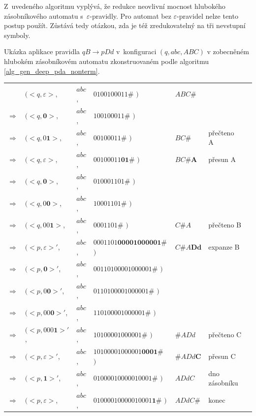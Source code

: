 Z~uvedeného algoritmu vyplývá, že redukce neovlivní mocnost hlubokého zásobníkového automatu s~$\varepsilon$-pravidly. Pro automat bez $\varepsilon$-pravidel nelze tento postup použít. Zůstává tedy otázkou, zda je též zredukovatelný na tři nevstupní symboly.


\begin{Example}
Ukázka aplikace pravidla $qB \rightarrow p Dd$ v~konfiguraci $(q, abc, ABC)$ v zobecněném hlubokém zásobníkovém automatu zkonstruovaném podle algoritmu \ref{alg_gen_deep_pda_nonterm}.

\begin{center}
\begin{tabular}{llll|l|ll}
                & $( <q, \varepsilon>$,  & $abc$, & $0100100011\#$         $)$ & $ABC\#$ \\
$\Rightarrow$   & $( <q, \mathbf{0}>$,            & $abc$, & $100100011\#$         $)$ & \\
$\Rightarrow$   & $( <q, 0\mathbf{1}>$,           & $abc$, & $00100011\#$         $)$ &   $BC\#$ & přečteno A~\\
$\Rightarrow$   & $( <q, \varepsilon>$,  & $abc$, & $00100011\mathbf{01}\#$         $)$ & $BC\#\mathbf{A}$ & přesun A~\\
$\Rightarrow$   & $( <q, \mathbf{0}>$,            & $abc$, & $010001101\#$         $)$ & \\
$\Rightarrow$   & $( <q, 0\mathbf{0}>$,           & $abc$, & $10001101\#$         $)$ & \\
$\Rightarrow$   & $( <q, 00\mathbf{1}>$,          & $abc$, & $0001101\#$         $)$ &    $C\#A$ & přečteno B \\
$\Rightarrow$   & $( <p,\varepsilon>'$,   & $abc$, & $0001101\mathbf{00001000001}\#$         $)$ & $C\#A\mathbf{Dd}$ & expanze B \\
$\Rightarrow$   & $( <p,\mathbf{0}>'$,   & $abc$, & $00110100001000001\#$         $)$ & \\
$\Rightarrow$   & $( <p,0\mathbf{0}>'$,   & $abc$, & $0110100001000001\#$         $)$ & \\
$\Rightarrow$   & $( <p,00\mathbf{0}>'$,   & $abc$, & $110100001000001\#$         $)$ & \\
$\Rightarrow$   & $( <p,000\mathbf{1}>'$,   & $abc$, & $10100001000001\#$         $)$ & $\#ADd$ & přečteno C  \\
$\Rightarrow$   & $( <p,\varepsilon>'$,   & $abc$, & $10100001000001\mathbf{0001}\#$         $)$ & $\#ADd\mathbf{C}$ & přesun C \\
$\Rightarrow$   & $( <p,\mathbf{1}>'$,   & $abc$, & $01000010000010001\#$         $)$ & $ADdC$ & dno zásobníku \\
$\Rightarrow$   & $( <p,\varepsilon>$,   & $abc$, & $01000010000010001\mathbf{1}\#$         $)$ & $ADdC\mathbf{\#}$ & konec


\end{tabular}
\end{center}


\end{Example}

